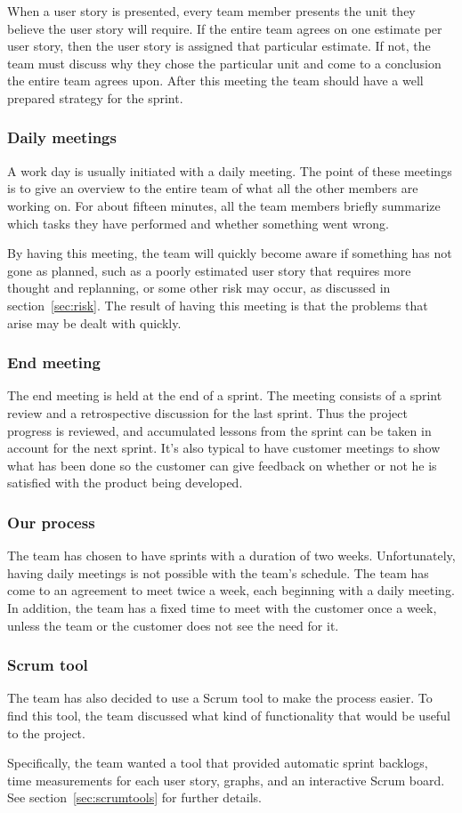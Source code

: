 When a user story is presented, every team member presents the unit they believe the user story will require. If the entire team agrees on one estimate per user story, then the user story is assigned that particular estimate. If not, the team must discuss why they chose the particular unit and come to a conclusion the entire team agrees upon.
After this meeting the team should have a well prepared strategy for the sprint.

\subsubsection{Daily meetings}
A work day is usually initiated with a daily meeting. The point of these meetings is to give an overview to the entire team of what all the other members are working on. For about fifteen minutes, all the team members briefly summarize which tasks they have performed and whether something went wrong.

By having this meeting, the team will quickly become aware if something has not gone as planned, such as a poorly estimated user story that requires more thought and replanning, or some other risk may occur, as discussed in section~\ref{sec:risk}. The result of having this meeting is that the problems that arise may be dealt with quickly.

\subsubsection{End meeting}
The end meeting is held at the end of a sprint. The meeting consists of a sprint review and a retrospective discussion for the last sprint.
Thus the project progress is reviewed, and accumulated lessons from the sprint can be taken in account for the next sprint.
It's also typical to have customer meetings to show what has been done so the customer can give feedback on 
whether or not he is satisfied with the product being developed.

\subsubsection{Our process}
The team has chosen to have sprints with a duration of two weeks. Unfortunately, having daily meetings is not possible with the team's schedule. The team has come to an agreement to meet twice a week, each beginning with a daily meeting. In addition, the team has a fixed time to meet with the customer once a week, unless the team or the customer does not see the need for it.

\subsubsection{Scrum tool}
The team has also decided to use a Scrum tool to make the process easier.
To find this tool, the team discussed what kind of functionality that would be useful to the project.

Specifically, the team wanted a tool that provided automatic sprint backlogs, time measurements for each user story, graphs, and an interactive Scrum board. See section~\ref{sec:scrumtools} for further details.
